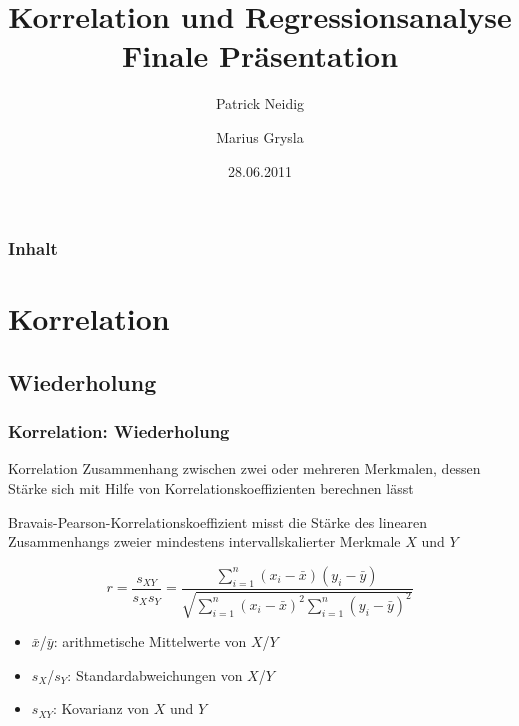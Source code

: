 \documentclass{beamer}
\begin{document}
\title{Korrelation und Regressionsanalyse\\
Finale Präsentation}
\author{Patrick Neidig \and Marius Grysla}
\date{28.06.2011}
\frame{\titlepage}

\begin{frame}
 \frametitle{Inhalt}
 \tableofcontents
\end{frame}

\section{Korrelation}

\subsection{Wiederholung}

\begin{frame}
	\frametitle{Korrelation: Wiederholung}
	
	\begin{block}{Korrelation}
		Zusammenhang zwischen zwei oder mehreren Merkmalen, dessen Stärke sich mit Hilfe von Korrelationskoeffizienten berechnen lässt
	\end{block}
	
	\begin{block}{Bravais-Pearson-Korrelationskoeffizient}
		misst die Stärke des linearen Zusammenhangs zweier mindestens intervallskalierter Merkmale $X$ und $Y$
		
		\begin{equation*}
			r=\dfrac{s_{XY}}{s_Xs_Y}=\dfrac{\sum_{i=1}^{n}{(x_i-\bar{x})(y_i-\bar{y})}}{\sqrt{\sum_{i=1}^{n}{(x_i-\bar{x})^2\sum_{i=1}^{n}{(y_i-\bar{y})^2}}}}
		\end{equation*}
		
		\begin{itemize}
			\item $\bar{x}$/$\bar{y}$: arithmetische Mittelwerte von $X$/$Y$
			\item $s_{X}$/$s_{Y}$: Standardabweichungen von $X$/$Y$
			\item $s_{XY}$: Kovarianz von $X$ und $Y$
		\end{itemize}
	\end{block}
\end{frame}
\end{document}
